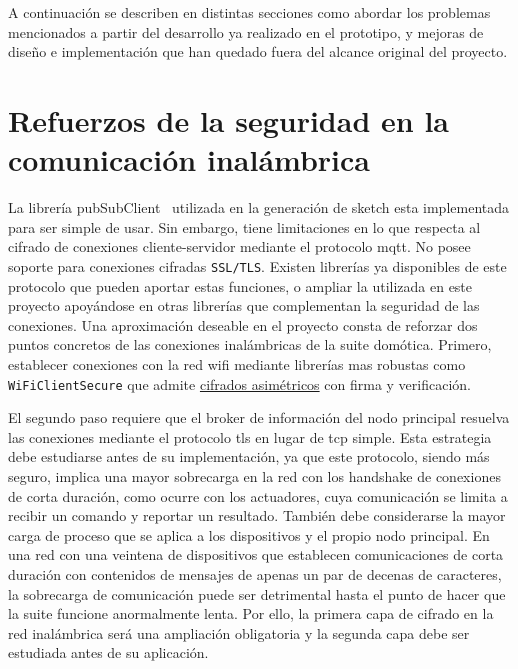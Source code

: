 \vspace{1cm}

A continuación se describen en distintas secciones como abordar los problemas mencionados a partir del desarrollo ya realizado en el prototipo, y mejoras de diseño e implementación que han quedado fuera del alcance original del proyecto.

\section{Refuerzos de la seguridad en la comunicación inalámbrica}
\label{ch:Capitulo6.1}
La librería pubSubClient~\cite{pubsubclientapi} utilizada en la generación de \gls{sketch} esta implementada para ser simple de usar. Sin embargo, tiene limitaciones en lo que respecta al cifrado de conexiones cliente-servidor mediante el protocolo \gls{mqtt}. No posee soporte para conexiones cifradas \verb|SSL/TLS|. Existen librerías ya disponibles de este protocolo que pueden aportar estas funciones, o ampliar la utilizada en este proyecto apoyándose en otras librerías que complementan la seguridad de las conexiones. Una aproximación deseable en el proyecto consta de reforzar dos puntos concretos de las conexiones inalámbricas de la suite domótica. Primero, establecer conexiones con la red \gls{wifi} mediante librerías mas robustas como \verb|WiFiClientSecure| que admite \href{https://arduino-esp8266.readthedocs.io/en/latest/esp8266wifi/client-secure-class.html}{cifrados asimétricos} con firma y verificación. 

\vspace{1cm}

El segundo paso requiere que el \gls{broker} de información del nodo principal resuelva las conexiones mediante el protocolo \gls{tls} en lugar de \gls{tcp} simple. Esta estrategia debe estudiarse antes de su implementación, ya que este protocolo, siendo más seguro, implica una mayor sobrecarga en la red con los \gls{handshake} de conexiones de corta duración, como ocurre con los actuadores, cuya comunicación se limita a recibir un comando y reportar un resultado. También debe considerarse la mayor carga de proceso que se aplica a los dispositivos y el propio nodo principal. En una red con una veintena de dispositivos que establecen comunicaciones de corta duración con contenidos de mensajes de apenas un par de decenas de caracteres, la sobrecarga de comunicación puede ser detrimental hasta el punto de hacer que la suite funcione anormalmente lenta. Por ello, la primera capa de cifrado en la red inalámbrica será una ampliación obligatoria y la segunda capa debe ser estudiada antes de su aplicación.


